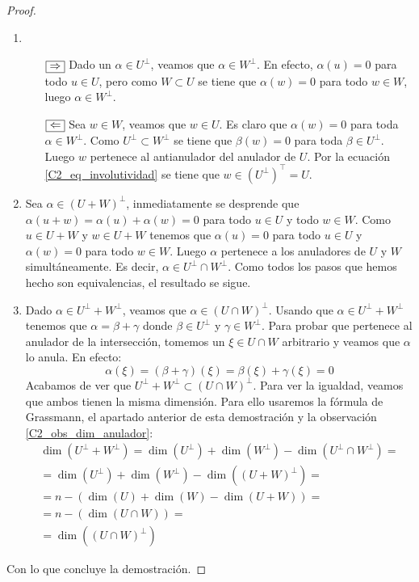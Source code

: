 \begin{proof}
	\begin{enumerate}
		\item \begin{itemize}
			\item[$\fbox{$\Rightarrow$}$] Dado un $\alpha\in U^\perp$, veamos que $\alpha\in W^\perp$. En efecto, $\alpha(u)=0$ para todo $u\in U$, pero como $W\subset U$ se tiene que $\alpha(w)=0$ para todo $w\in W$, luego $\alpha\in W^\perp$.
			
			\item[$\fbox{$\Leftarrow$}$] Sea $w\in W$, veamos que $w\in U$. Es claro que $\alpha(w)=0$ para toda $\alpha \in W^{\perp}$. Como $U^{\perp}\subset W^{\perp}$ se tiene que $\beta (w)=0$ para toda $\beta\in U^{\perp}$. Luego $w$ pertenece al antianulador del anulador de $U$. Por la ecuación \eqref{C2_eq_involutividad} se tiene que $w\in (U^\perp)^\top=U$.
		\end{itemize}
		
		
		\item Sea $\alpha\in(U+W)^\perp$, inmediatamente se desprende que $\alpha(u+w)=\alpha(u)+\alpha(w)=0$ para todo $u\in U$ y todo $w\in W$. Como $u\in U+W$ y $w\in U+W$ tenemos que $\alpha(u)=0$ para todo $u\in U$ y $\alpha(w)=0$ para todo $w\in W$. Luego $\alpha$ pertenece a los anuladores de $U$ y $W$ simultáneamente. Es decir, $\alpha\in U^\perp\cap W^\perp$. Como todos los pasos que hemos hecho son equivalencias, el resultado se sigue.
		\item Dado $\alpha\in U^\perp + W^\perp$, veamos que $\alpha\in (U\cap W)^\perp$. Usando que $\alpha\in U^\perp + W^\perp$ tenemos que $\alpha=\beta+\gamma$ donde $\beta\in U^\perp$ y $\gamma\in W^\perp$. Para probar que pertenece al anulador de la intersección, tomemos un $\xi\in U\cap W$ arbitrario y veamos que $\alpha$ lo anula. En efecto:
		\[\alpha(\xi)=(\beta+\gamma)(\xi)=\beta(\xi)+\gamma(\xi)=0\]
		Acabamos de ver que $U^\perp+W^\perp\subset(U\cap W)^\perp$. Para ver la igualdad, veamos que ambos tienen la misma dimensión. Para ello usaremos la fórmula de Grassmann, el apartado anterior de esta demostración y la observación \ref{C2_obs_dim_anulador}:
		\begin{multline}
			\dim(U^\perp+W^\perp)=\dim(U^\perp)+\dim(W^\perp)-\dim(U^\perp\cap W^\perp)=\\
			=\dim(U^\perp)+\dim(W^\perp)-\dim((U+ W)^\perp)=\\
			=n-(\dim(U)+\dim(W)-\dim(U+W))=\\
			=n-(\dim(U\cap W))=\\
			=\dim((U\cap W)^\perp)
		\end{multline}
	\end{enumerate}
	Con lo que concluye la demostración.
\end{proof}

